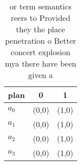 \documentclass[a4paper]{article}
\begin{document}
\begin{table}
\begin{adjustbox}{width=0.9\columnwidth}
\begin{tabular}{|l|l|l|}
\hline
\textbf{plan} & \multicolumn{1}{c|}{\textbf{0}} & \multicolumn{1}{c|}{\textbf{1}} \\ \hline
\textbf{$a_0$}  & (0,0) & (1,0) \\ \hline
\textbf{$a_1$}  & (0,0) & (1,0) \\ \hline
\textbf{$a_2$}  & (0,0) & (1,0) \\ \hline
\textbf{$a_3$}  & (0,0) & (1,0) \\ \hline
\end{tabular}
\end{adjustbox}
\caption{ or term semantics reers to Provided they the place penetration o Better concert explosion mya there have been given a 
}
\end{table}
\end{document}
